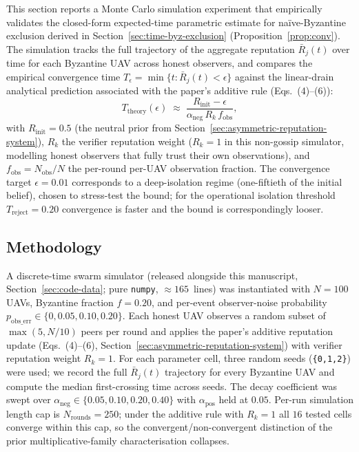 \documentclass[journal,10pt,twocolumn]{IEEEtran}
\begin{document}
This section reports a Monte Carlo simulation experiment that
empirically validates the closed-form expected-time parametric estimate for
na\"ive-Byzantine exclusion derived in
Section~\ref{sec:time-byz-exclusion} (Proposition~\ref{prop:conv}).
The simulation tracks the full trajectory of the aggregate reputation
$\bar{R}_j(t)$ over time for each Byzantine UAV across honest observers,
and compares the empirical convergence time
$T_\epsilon = \min\{t : \bar{R}_j(t) < \epsilon\}$ against the
linear-drain analytical prediction associated with the paper's additive
rule (Eqs.~(4)--(6)):
\begin{equation}
T_\text{theory}(\epsilon) \;\approx\;
\frac{R_\text{init} - \epsilon}{\alpha_\text{neg}\, R_k\, f_\text{obs}},
\label{eq:theory-bound}
\end{equation}
with $R_\text{init} = 0.5$ (the neutral prior from
Section~\ref{sec:asymmetric-reputation-system}), $R_k$ the verifier
reputation weight ($R_k = 1$ in this non-gossip simulator,
modelling honest observers that fully trust their own observations),
and $f_\text{obs} = N_\text{obs}/N$ the per-round per-UAV observation
fraction. The convergence target $\epsilon = 0.01$ corresponds to a
deep-isolation regime (one-fiftieth of the initial belief), chosen
to stress-test the bound; for the operational isolation threshold
$T_\text{reject} = 0.20$ convergence is faster and the bound is
correspondingly looser.

\subsection{Methodology}

A discrete-time swarm simulator (released alongside this manuscript, Section~\ref{sec:code-data}; pure \texttt{numpy}, $\approx 165$~lines)
was instantiated with $N=100$ UAVs, Byzantine fraction $f=0.20$, and
per-event observer-noise probability $p_\text{obs\_err}\in\{0,0.05,0.10,0.20\}$.
Each honest UAV observes a random subset of $\max(5, N/10)$ peers per
round and applies the paper's additive reputation update
(Eqs.~(4)--(6), Section~\ref{sec:asymmetric-reputation-system}) with
verifier reputation weight $R_k=1$. For each parameter cell, three
random seeds (\texttt{\{0,1,2\}}) were used; we record the full
$\bar{R}_j(t)$ trajectory for every Byzantine UAV and compute the
median first-crossing time across seeds. The decay coefficient was
swept over $\alpha_\text{neg}\in\{0.05,0.10,0.20,0.40\}$ with
$\alpha_\text{pos}$ held at $0.05$. Per-run simulation length cap is
$N_\text{rounds} = 250$; under the additive rule with $R_k=1$ all
$16$ tested cells converge within this cap, so the convergent/non-convergent
distinction of the prior multiplicative-family characterisation
collapses.
\end{document}
